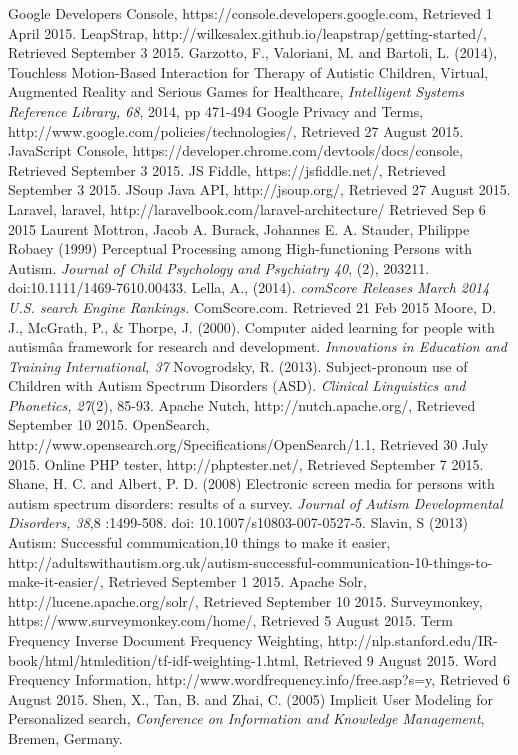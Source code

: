 \documentclass[a4paper, 11pt]{article}
\begin{document}
\begin{thebibliography}{100}
 Google Developers Console, https://console.developers.google.com, Retrieved 1 April 2015.
 LeapStrap, http://wilkesalex.github.io/leapstrap/getting-started/, Retrieved September 3 2015.
 Garzotto, F., Valoriani, M. and Bartoli, L. (2014), Touchless Motion-Based Interaction for Therapy of Autistic Children, Virtual, Augmented Reality and Serious Games for Healthcare, \textit{Intelligent Systems Reference Library, 68}, 2014, pp 471-494
 Google Privacy and Terms, http://www.google.com/policies/technologies/, Retrieved 27 August 2015.
 JavaScript Console, https://developer.chrome.com/devtools/docs/console, Retrieved September 3 2015.
 JS Fiddle, https://jsfiddle.net/, Retrieved September 3 2015.
 JSoup Java API, http://jsoup.org/, Retrieved 27 August 2015.
Laravel, laravel, http://laravelbook.com/laravel-architecture/ Retrieved Sep 6 2015
Laurent Mottron, Jacob A. Burack, Johannes E. A. Stauder, Philippe Robaey (1999) Perceptual Processing among High-functioning Persons with Autism. \textit{Journal of Child Psychology and Psychiatry 40}, (2), 203211. doi:10.1111/1469-7610.00433.
Lella, A., (2014). \textit{comScore Releases March 2014 U.S. search Engine Rankings.} ComScore.com. Retrieved 21 Feb 2015
Moore, D. J., McGrath, P., \& Thorpe, J. (2000). Computer aided learning for people with autismâa framework for research and development. \textit{Innovations in Education and Training International, 37}
 Novogrodsky, R. (2013). Subject-pronoun use of Children with Autism Spectrum Disorders (ASD). \textit{Clinical Linguistics and Phonetics, 27}(2), 85-93. 
 Apache Nutch, http://nutch.apache.org/, Retrieved September 10 2015.
OpenSearch, http://www.opensearch.org/Specifications/OpenSearch/1.1, Retrieved 30 July 2015.
 Online PHP tester, http://phptester.net/, Retrieved September 7 2015.
Shane, H. C. and Albert, P. D. (2008) Electronic screen media for persons with autism spectrum disorders: results of a survey. \textit{Journal of Autism Developmental Disorders, 38},8 :1499-508. doi: 10.1007/s10803-007-0527-5.
 Slavin, S (2013) Autism: Successful communication,10 things to make it easier, http://adultswithautism.org.uk/autism-successful-communication-10-things-to-make-it-easier/, Retrieved September 1 2015.
 Apache Solr, http://lucene.apache.org/solr/, Retrieved September 10 2015.
Surveymonkey, https://www.surveymonkey.com/home/, Retrieved 5 August 2015.
 Term Frequency Inverse Document Frequency Weighting, http://nlp.stanford.edu/IR-book/html/htmledition/tf-idf-weighting-1.html, Retrieved 9 August 2015.
 Word Frequency Information, http://www.wordfrequency.info/free.asp?s=y, Retrieved 6 August 2015.
Shen, X., Tan, B. and Zhai, C. (2005) Implicit User Modeling for Personalized search, \textit{Conference on Information and Knowledge Management}, Bremen, Germany.
\end{thebibliography}
\end{document}
